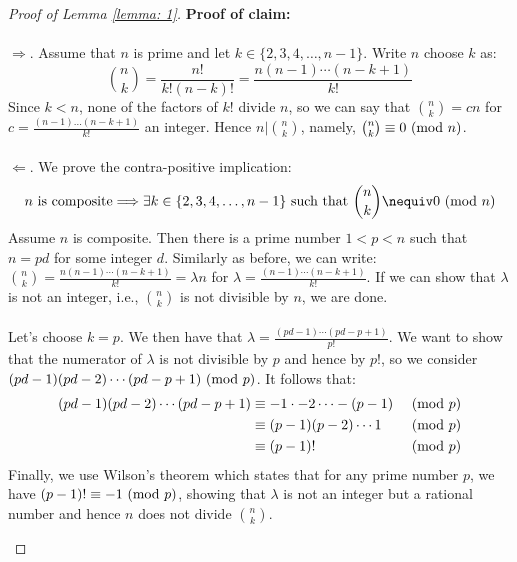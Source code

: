 \documentclass[main.tex]{subfiles}
\begin{document}
% 

\begin{proof}[Proof of Lemma \ref{lemma: 1}]

\textbf{Proof of claim:}\\
\\
$\Longrightarrow$. Assume that $n$ is prime and let $k\in\{2,3,4, \dots, n-1\}$. 
Write $n$ choose $k$ as:
\begin{equation*}
    \binom{n}{k} = \frac{n!}{k!(n-k)!} = \frac{n(n-1)\cdots(n-k+1)}{k!}
\end{equation*}
Since $k<n$, none of the factors of $k!$ divide $n$, so we can say that $\binom{n}{k} = cn$ for $c = \frac{(n-1)...(n-k+1)}{k!}$ an integer.
Hence $n | \binom{n}{k}$, namely, $\binom{n}{k}\equiv 0 \ (\mathrm{mod}\ n)$.
\\
\\
$\Longleftarrow$. We prove the contra-positive implication:
\begin{equation*}
    n\text{ is composite}\Longrightarrow\exists k\in\{2,3,4,\dots,n-1\} \text{ such that } \binom{n}{k}\nequiv 0 \Mod n
\end{equation*}
Assume $n$ is composite. Then there is a prime number $1<p<n$ such that $n=pd$ for some integer $d$. Similarly as before, we can write:
$\binom{n}{k}=\frac{n(n-1)\cdots(n-k+1)}{k!}= \lambda n$ for $\lambda = \frac{(n-1)\cdots(n-k+1)}{k!}$.
If we can show that $\lambda$ is not an integer, i.e., $\binom{n}{k}$ is not divisible by $n$, we are done.\\
\\
Let's choose $k=p$.
We then have that $\lambda = \frac{(pd-1)\cdots(pd-p+1)}{p!}$.
We want to show that the numerator of $\lambda$ is not divisible by $p$ and hence by $p!$, so we consider $(pd-1)(pd-2)\cdots(pd-p+1)\ (\mathrm{mod}\ p)$.
It follows that:
\begin{align*}
    (pd-1)(pd-2)\cdots(pd-p+1)
    & \equiv -1\cdot-2\cdots-(p-1)
    && \ (\mathrm{mod}\ p)
    \\ & \equiv (p-1)(p-2)\cdots1
    && \ (\mathrm{mod}\ p)
    \\ & \equiv (p-1)!\,
    && \ (\mathrm{mod}\ p)
\end{align*}
Finally, we use Wilson's theorem which states that for any prime number $p$, we have $(p-1)!\equiv-1\ (\mathrm{mod}\ p)$, showing that $\lambda$ is not an integer but a rational number and hence $n$ does not divide $\binom{n}{k}$.

\cite[p4]{AGranville_2004}

\end{proof}
\end{document}
